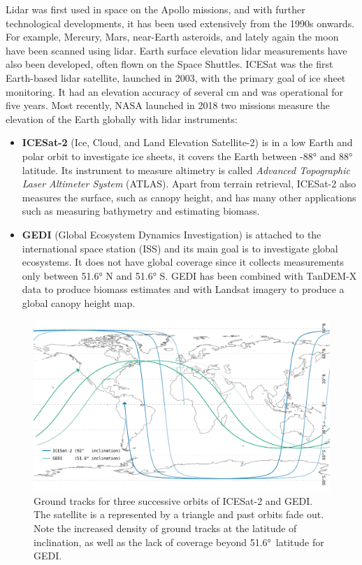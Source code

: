 Lidar was first used in space on the Apollo missions, and with further technological developments, it has been used extensively from the 1990s onwards.
For example, Mercury, Mars, near-Earth asteroids, and lately again the moon have been scanned using lidar.
Earth surface elevation lidar measurements have also been developed, often flown on the Space Shuttles.
ICESat was the first Earth-based lidar satellite, launched in 2003, with the primary goal of ice sheet monitoring.
It had an elevation accuracy of several cm and was operational for five years.
Most recently, NASA launched in 2018 two missions measure the elevation of the Earth globally with lidar instruments:

\begin{itemize}
  \item \textbf{ICESat-2}
        (Ice, Cloud, and Land Elevation Satellite-2) is in a low Earth and polar orbit to investigate ice sheets, it covers the Earth between \ang{-88} and \ang{88} latitude.
        Its instrument to measure altimetry is called \emph{Advanced Topographic Laser Altimeter System} (ATLAS).
        Apart from terrain retrieval, ICESat-2 also measures the surface, such as canopy height, and has many other applications such as measuring bathymetry and estimating biomass.
  \item \textbf{GEDI}
        (Global Ecosystem Dynamics Investigation) is attached to the international space station (ISS) and its main goal is to investigate global ecosystems.
        It does not have global coverage since it collects measurements only between \ang{51.6} N and \ang{51.6} S.
        GEDI has been combined with TanDEM-X data to produce biomass estimates and with Landsat imagery to produce a global canopy height map.
\end{itemize}
\begin{figure}
  \centering
  \includegraphics[width=\linewidth]{orbit}
  \caption{Ground tracks for three successive orbits of ICESat-2 and GEDI. The satellite is a represented by a triangle and past orbits fade out. Note the increased density of ground tracks at the latitude of inclination, as well as the lack of coverage beyond \ang{51.6}~latitude for GEDI.}%
\end{figure}

